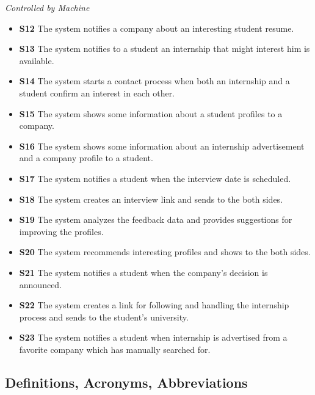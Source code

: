 \documentclass{article}
\begin{document}
    \textit{Controlled by Machine}
    \begin{itemize}
        \item \textbf{S12} The system notifies a company about an interesting student resume.
        \item \textbf{S13} The system notifies to a student an internship that might interest him is available.
        \item \textbf{S14} The system starts a contact process when both an internship and a student confirm an interest in each other.
        \item \textbf{S15} The system shows some information about a student profiles to a company.
        \item \textbf{S16} The system shows some information about an internship advertisement and a company profile to a student.
        \item \textbf{S17} The system notifies a student when the interview date is scheduled.
        \item \textbf{S18} The system creates an interview link and sends to the both sides.
        \item \textbf{S19} The system analyzes the feedback data and provides suggestions for improving the profiles. 
        \item \textbf{S20} The system recommends interesting profiles and shows to the both sides.
        \item \textbf{S21} The system notifies a student when the company's decision is announced.
        \item \textbf{S22} The system creates a link for following and handling the internship process and sends to the student's university.
        \item \textbf{S23} The system notifies a student when internship is advertised from a favorite company which has manually searched for.
    \end{itemize}
\subsection{Definitions, Acronyms, Abbreviations}
\end{document}

